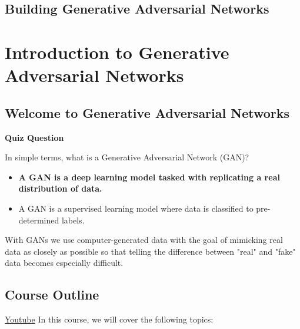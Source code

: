 \section{Building Generative Adversarial Networks}

\chapter{Introduction to Generative Adversarial Networks}

\section{Welcome to Generative Adversarial Networks}

\textbf{Quiz Question}

In simple terms, what is a Generative Adversarial Network (GAN)?
\begin{itemize}
    \item \textbf{A GAN is a deep learning model tasked with replicating a real distribution of data.}
    \item A GAN is a supervised learning model where data is classified to pre-determined labels.
\end{itemize}

With GANs we use computer-generated data with the goal of mimicking real data as closely as possible so that telling the difference between "real" and "fake" data becomes especially difficult.

\section{Course Outline}
\href{https://www.youtube.com/watch?v=Kv6-XVkTb14&t=4s}{Youtube} \newline
In this course, we will cover the following topics:

